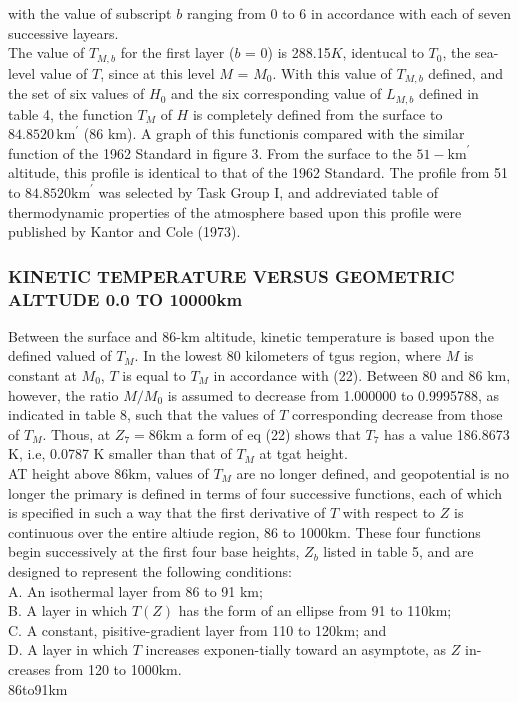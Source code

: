 \documentclass{article}
\begin{document}
with the value of subscript $b$ ranging from 0 to 6 in accordance with each of seven successive layears.\\
The value of $T_{M,b}$ for the first layer ($b$ = 0) is 288.15$K$, identucal to $T_0$, the sea-level value of $T$, since at this level $M$ = $M_0$. With this value of $T_{M,b}$ defined, and the set of six values of $H_0$ and the six corresponding value of $L_{M,b}$ defined in table 4, the function $T_M$ of $H$ is completely defined from the surface to $84.8520 \, \text{km}^{\prime}$ (86 km). A graph of this functionis compared with the similar function of the 1962 Standard in figure 3. From the surface to the $51-\text{km}^\prime$ altitude, this profile is identical to that of the 1962 Standard. The profile from 51 to $84.8520 \text{km}^\prime$ was selected by Task Group I, and addreviated table of thermodynamic properties of the atmosphere based upon this profile were published by Kantor and Cole (1973).

\subsubsection{KINETIC TEMPERATURE VERSUS GEOMETRIC ALTTUDE 0.0 TO 10000km}
Between the surface and 86-km altitude, kinetic temperature is based upon the defined valued of $T_M$. In the lowest 80 kilometers of tgus region, where $M$ is constant at $M_0$, $T$ is equal to $T_M$ in accordance with (22). Between 80 and 86 km, however, the ratio $M/M_0$ is assumed to decrease from 1.000000 to 0.9995788, as indicated in table 8, such that the values of $T$ corresponding decrease from those of $T_M$. Thous, at $Z_7 = 86$km a form of eq (22) shows that $T_7$ has a value 186.8673 K, i.e, 0.0787 K smaller than that of $T_M$ at tgat height.\\

AT height above 86km, values of $T_M$ are no longer defined, and geopotential is no longer the primary is defined in terms of four successive functions, each of which is specified in such a way that the first derivative of $T$ with respect to $Z$ is continuous over the entire altiude region, 86 to 1000km. These four functions begin successively at the first four base heights, $Z_b$ listed in table 5, and are designed to represent the following conditions:\\
\indent A. An isothermal layer from 86 to 91 km;\\
\indent B. A layer in which $T(Z)$ has the form of an ellipse from 91 to 110km;\\
\indent C. A constant, pisitive-gradient layer from 110 to 120km; and\\
\indent D. A layer in which $T$ increases exponen-tially toward an asymptote, as $Z$ in-creases from 120 to 1000km.\\
86to91km\\
\end{document}
